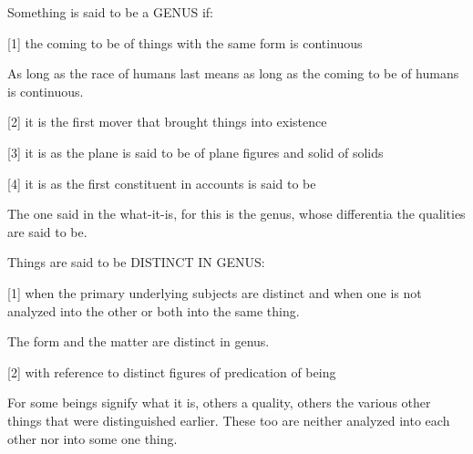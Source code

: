 
Something is said to be a GENUS if:

[1]     the coming to be of things with the same form is continuous

        As long as the race of humans last means as long as
        the coming to be of humans is continuous.

[2]     it is the first mover that brought things into existence

[3]     it is as the plane is said to be of plane figures and solid of solids

[4]     it is as the first constituent in accounts is said to be

        The one said in the what-it-is, for this is the genus,
        whose differentia the qualities are said to be.

Things are said to be DISTINCT IN GENUS:

[1]     when the primary underlying subjects are distinct and
        when one is not analyzed into the other or 
        both into the same thing.

        The form and the matter are distinct in genus.

[2]     with reference to distinct figures of predication of being

        For some beings signify what it is, others a quality,
        others the various other things that were distinguished earlier.
        These too are neither analyzed into each other nor into some one thing.
